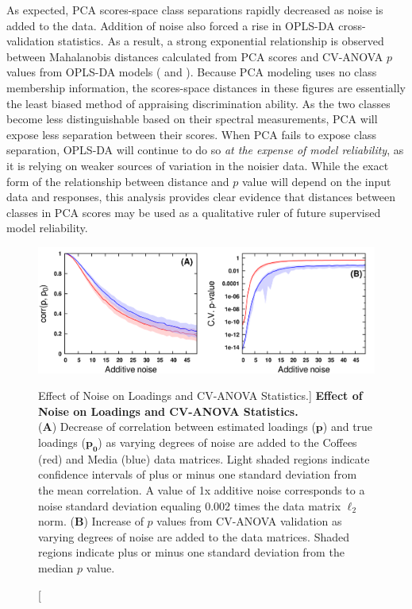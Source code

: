 \begin{doublespace}
As expected, PCA scores-space class separations rapidly decreased as noise is
added to the data. Addition of noise also forced a rise in OPLS-DA
cross-validation statistics. As a result, a strong exponential relationship
is observed between Mahalanobis distances calculated from PCA scores and
CV-ANOVA $p$ values from OPLS-DA models ( and
). Because PCA modeling uses no class membership
information, the scores-space distances in these figures are essentially the
least biased method of appraising discrimination ability. As the two classes
become less distinguishable based on their spectral measurements, PCA will
expose less separation between their scores. When PCA fails to expose class
separation, OPLS-DA will continue to do so
\emph{at the expense of model reliability}, as it is relying on weaker
sources of variation in the noisier data. While the exact form of the
relationship between distance and $p$ value will depend on the input data and
responses, this analysis provides clear evidence that distances between classes
in PCA scores may be used as a qualitative ruler of future supervised model
reliability.
\end{doublespace}

\begin{figure}[ht!]
\includegraphics[width=6.5in]{figs/apps/17-lines.png}
\caption
      [Effect of Noise on Loadings and CV-ANOVA Statistics.]{
  {\bf Effect of Noise on Loadings and CV-ANOVA Statistics.}
  \\
  ({\bf A}) Decrease of correlation between estimated loadings ($\mathbf{p}$)
  and true loadings ($\mathbf{p_0}$) as varying degrees of noise are added to
  the Coffees (red) and Media (blue) data matrices. Light shaded regions
  indicate confidence intervals of plus or minus one standard deviation from
  the mean correlation. A value of 1x additive noise corresponds to a noise
  standard deviation equaling 0.002 times the data matrix $\ell_2$ norm.
  ({\bf B}) Increase of $p$ values from CV-ANOVA validation as varying degrees
  of noise are added to the data matrices. Shaded regions indicate plus or
  minus one standard deviation from the median $p$ value.
}
\label{figure.4.17}
\end{figure}

